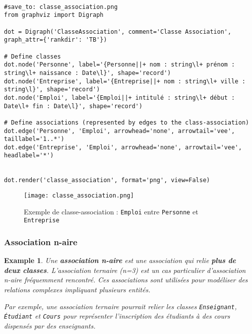 \documentclass{article}
\newtheorem{example}{Example}
\begin{document}
\begin{verbatim}

#save_to: classe_association.png
from graphviz import Digraph

dot = Digraph('ClasseAssociation', comment='Classe Association', graph_attr={'rankdir': 'TB'})

# Define classes
dot.node('Personne', label='{Personne||+ nom : string\l+ prénom : string\l+ naissance : Date\l}', shape='record')
dot.node('Entreprise', label='{Entreprise||+ nom : string\l+ ville : string\l}', shape='record')
dot.node('Emploi', label='{Emploi||+ intitulé : string\l+ début : Date\l+ fin : Date\l}', shape='record')

# Define associations (represented by edges to the class-association)
dot.edge('Personne', 'Emploi', arrowhead='none', arrowtail='vee', taillabel='1..*')
dot.edge('Entreprise', 'Emploi', arrowhead='none', arrowtail='vee', headlabel='*')


dot.render('classe_association', format='png', view=False)
\end{verbatim}

\begin{figure}[h]
    \centering
    \texttt{[image: classe\_association.png]}
    \caption{Exemple de classe-association : \texttt{Emploi} entre \texttt{Personne} et \texttt{Entreprise}}
    \label{fig:classe_association}
\end{figure}


\subsubsection{Association n-aire}
\begin{example}
Une \textbf{association n-aire} est une association qui relie \textbf{plus de deux classes}. L'association ternaire (n=3) est un cas particulier d'association n-aire fréquemment rencontré.  Ces associations sont utilisées pour modéliser des relations complexes impliquant plusieurs entités.

Par exemple, une association ternaire pourrait relier les classes \texttt{Enseignant}, \texttt{Étudiant} et \texttt{Cours} pour représenter l'inscription des étudiants à des cours dispensés par des enseignants.
\end{example}
\end{document}
